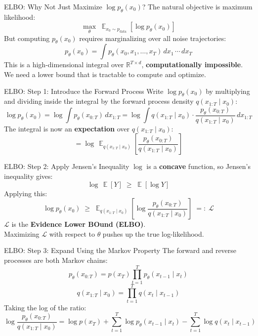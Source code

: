 \documentclass[10pt, aspectratio=169]{beamer}
\DeclareMathOperator*{\E}{\mathbb{E}}
\begin{document}

\begin{frame}{ELBO: Why Not Just Maximize $\log p_\theta(x_0)$?}
  The natural objective is maximum likelihood:
  \[
    \max_\theta \;\E_{x_0 \sim p_{\mathrm{data}}}\!\left[\log p_\theta(x_0)\right]
  \]
  But computing $p_\theta(x_0)$ requires marginalizing over all noise trajectories:
  \[
    p_\theta(x_0) = \int p_\theta(x_0, x_1, \ldots, x_T)\,dx_1\,\cdots\,dx_T
  \]
  This is a high-dimensional integral over $\mathbb{R}^{T \times d}$, \textbf{computationally impossible}.\\[8pt]
  We need a lower bound that is tractable to compute and optimize.
\end{frame}

\begin{frame}{ELBO: Step 1: Introduce the Forward Process}
  Write $\log p_\theta(x_0)$ by multiplying and dividing inside the integral by
  the forward process density $q(x_{1:T}\mid x_0)$:
  \[
    \log p_\theta(x_0) = \log \int p_\theta(x_{0:T})\,dx_{1:T}
    = \log \int q(x_{1:T}\mid x_0)\cdot\frac{p_\theta(x_{0:T})}{q(x_{1:T}\mid x_0)}\,dx_{1:T}
  \]
  The integral is now an \textbf{expectation} over $q(x_{1:T}\mid x_0)$:
  \[
    = \log \,\E_{q(x_{1:T}\mid x_0)}\!\left[\frac{p_\theta(x_{0:T})}{q(x_{1:T}\mid x_0)}\right]
  \]
\end{frame}

\begin{frame}{ELBO: Step 2: Apply Jensen's Inequality}
  $\log$ is a \textbf{concave} function, so Jensen's inequality gives:
  \[
    \log\,\E[Y] \;\geq\; \E[\log Y]
  \]
  Applying this:
  \[
    \log p_\theta(x_0)
    \;\geq\;
    \E_{q(x_{1:T}\mid x_0)}\!\left[\log\frac{p_\theta(x_{0:T})}{q(x_{1:T}\mid x_0)}\right]
    \;=:\; \mathcal{L}
  \]
  $\mathcal{L}$ is the \textbf{Evidence Lower BOund (ELBO)}.\\[8pt]
  Maximizing $\mathcal{L}$ with respect to $\theta$ pushes up the true log-likelihood.
\end{frame}

\begin{frame}{ELBO: Step 3: Expand Using the Markov Property}
  The forward and reverse processes are both Markov chains:
  \[
    p_\theta(x_{0:T}) = p(x_T)\prod_{t=1}^{T}p_\theta(x_{t-1}\mid x_t)
  \]
  \[
    q(x_{1:T}\mid x_0) = \prod_{t=1}^{T}q(x_t\mid x_{t-1})
  \]
  Taking the log of the ratio:
  \[
    \log\frac{p_\theta(x_{0:T})}{q(x_{1:T}\mid x_0)}
    = \log p(x_T) + \sum_{t=1}^{T}\log p_\theta(x_{t-1}\mid x_t)
      - \sum_{t=1}^{T}\log q(x_t\mid x_{t-1})
  \]
\end{frame}
\end{document}
